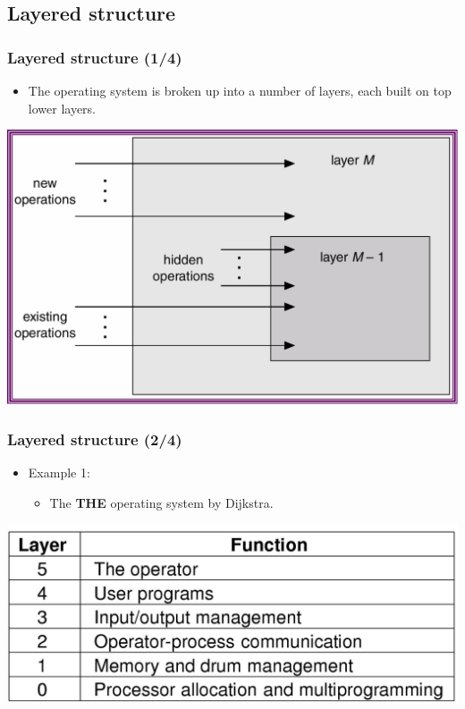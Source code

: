 \documentclass[CJKutf8,xcolor=pdftex,dvipsnames,table]{beamer}
\begin{document}
\begin{CJK*}{UTF8}{song}
  \subsection{Layered structure}

  \begin{frame}
    \frametitle{Layered structure (1/4)} \pause
    \begin{itemize}
    \item{The operating system is broken up into a number of layers, each built on top lower layers.} \pause
    \end{itemize}
    \begin{center}
      \includegraphics[scale=0.5]{v6f3-8}
    \end{center}
  \end{frame}

  \begin{frame}
    \frametitle{Layered structure (2/4)} \pause
    \begin{itemize}
    \item{Example 1:} \pause
      \begin{itemize}
      \item{The \textbf{THE} operating system by Dijkstra.}
      \end{itemize}
    \end{itemize}
    \begin{center}
      \includegraphics[scale=.2]{mosv2f1-25}
    \end{center}
  \end{frame}


\end{CJK*}
\end{document}

